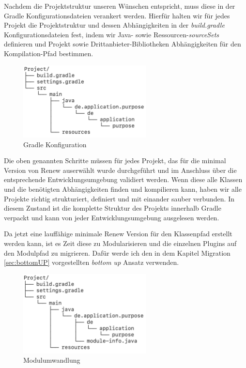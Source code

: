 Nachdem die Projektstruktur unseren Wünschen entspricht, muss diese in der Gradle Konfigurationsdateien verankert werden. Hierfür halten wir für jedes Projekt die Projektstruktur und dessen Abhängigkeiten in der \textit{build.gradle} Konfigurationsdateien fest, indem wir Java- sowie Ressourcen-\textit{sourceSets} definieren und Projekt sowie Drittanbieter-Bibliotheken Abhängigkeiten für den  Kompilation-Pfad bestimmen.

\begin{figure}[h!]
  \centering
  \includegraphics[width=0.6\textwidth]{material/images/gradle_project.png}
  \caption{Gradle Konfiguration}
  \label{fig:gradle_project}
\end{figure}

 Die oben genannten Schritte müssen für jedes Projekt, das für die minimal Version von Renew auserwählt wurde durchgeführt und im Anschluss über die entsprechende Entwicklungsumgebung  validiert werden. Wenn diese alle Klassen und die benötigten Abhängigkeiten finden und kompilieren kann, haben wir alle Projekte richtig strukturiert, definiert und mit einander sauber verbunden. In diesem Zustand ist die komplette Struktur des Projekts innerhalb Gradle verpackt und kann von jeder Entwicklungsumgebung ausgelesen werden. 


Da jetzt eine lauffähige minimale Renew Version für den Klassenpfad erstellt werden kann, ist es Zeit diese zu Modularisieren und die einzelnen Plugins auf den Modulpfad zu migrieren. Dafür werde ich den in dem Kapitel Migration \ref{sec:bottomUP} vorgestellten \textit{bottom up} Ansatz verwenden. 

\begin{figure}[h!]
  \centering
  \includegraphics[width=0.6\textwidth]{material/images/module_project.png}
  \caption{Modulumwandlung}
  \label{fig:module_project}
\end{figure}

